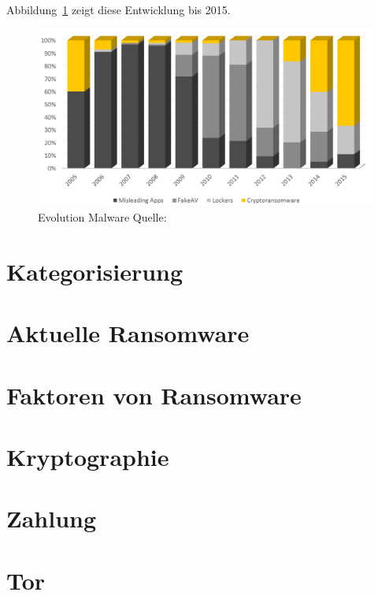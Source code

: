 \documentclass[runningheads,a4paper]{llncs}
\begin{document}
Abbildung~\ref{fig:ransom-evo} zeigt diese Entwicklung bis 2015.

	\begin{figure}[h!]
		\centering
		\includegraphics[width=\linewidth]{img/ransom-evolution.png}
		\caption{Evolution Malware Quelle: \cite{evolution}}
		\label{fig:ransom-evo}
	\end{figure}

\section{Kategorisierung}


\section{Aktuelle Ransomware}


\section{Faktoren von Ransomware}


\section{Kryptographie}


\section{Zahlung}


\section{Tor}

\end{document}
